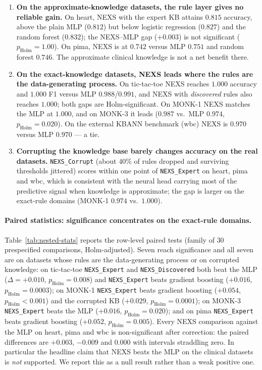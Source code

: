 \documentclass[11pt]{article}
\newcommand{\nexs}{\textsc{NEXS}}
\begin{document}
\begin{enumerate}
  \item \textbf{On the approximate-knowledge datasets, the rule layer gives no
  reliable gain.} On heart, \nexs{} with the expert KB attains $0.815$ accuracy,
  above the plain MLP ($0.812$) but below logistic regression ($0.827$) and the
  random forest ($0.832$); the \nexs{}--MLP gap ($+0.003$) is not significant
  ($p_{\mathrm{Holm}}=1.00$). On pima, \nexs{} is at $0.742$ versus MLP $0.751$
  and random forest $0.746$. The approximate clinical knowledge is not a net
  benefit there.
  \item \textbf{On the exact-knowledge datasets, \nexs{} leads where the rules are
  the data-generating process.} On tic-tac-toe \nexs{} reaches $1.000$ accuracy
  and $1.000$ F1 versus MLP $0.988$/$0.991$, and \nexs{} with \emph{discovered}
  rules also reaches $1.000$; both gaps are Holm-significant. On MONK-1 \nexs{}
  matches the MLP at $1.000$, and on MONK-3 it leads ($0.987$ vs.\ MLP $0.974$,
  $p_{\mathrm{Holm}}=0.020$). On the external KBANN benchmark (wbc) \nexs{} is
  $0.970$ versus MLP $0.970$ --- a tie.
  \item \textbf{Corrupting the knowledge base barely changes accuracy on the real
  datasets.} \texttt{NEXS\_Corrupt} (about $40\%$ of rules dropped and surviving
  thresholds jittered) scores within one point of \texttt{NEXS\_Expert} on heart,
  pima and wbc, which is consistent with the neural head carrying most of the
  predictive signal when knowledge is approximate; the gap is larger on the
  exact-rule domains (MONK-1 $0.974$ vs.\ $1.000$).
\end{enumerate}



\paragraph{Paired statistics: significance concentrates on the exact-rule domains.}
Table~\ref{tab:nested-stats} reports the row-level paired tests (family of $30$
prespecified comparisons, Holm-adjusted). Seven reach significance and all seven
are on datasets whose rules are the data-generating process or on corrupted
knowledge: on tic-tac-toe \texttt{NEXS\_Expert} and \texttt{NEXS\_Discovered} both
beat the MLP ($\Delta=+0.010$, $p_{\mathrm{Holm}}=0.008$) and \texttt{NEXS\_Expert}
beats gradient boosting ($+0.016$, $p_{\mathrm{Holm}}=0.0003$); on MONK-1
\texttt{NEXS\_Expert} beats gradient boosting ($+0.054$, $p_{\mathrm{Holm}}<0.001$)
and the corrupted KB ($+0.029$, $p_{\mathrm{Holm}}=0.0001$); on MONK-3
\texttt{NEXS\_Expert} beats the MLP ($+0.016$, $p_{\mathrm{Holm}}=0.020$); and on
pima \texttt{NEXS\_Expert} beats gradient boosting ($+0.052$,
$p_{\mathrm{Holm}}=0.005$). Every \nexs{} comparison against the MLP on heart,
pima and wbc is non-significant after correction: the paired differences are
$+0.003$, $-0.009$ and $0.000$ with intervals straddling zero. In particular the
headline claim that \nexs{} beats the MLP on the clinical datasets is \emph{not}
supported. We report this as a null result rather than a weak positive one.
\end{document}
